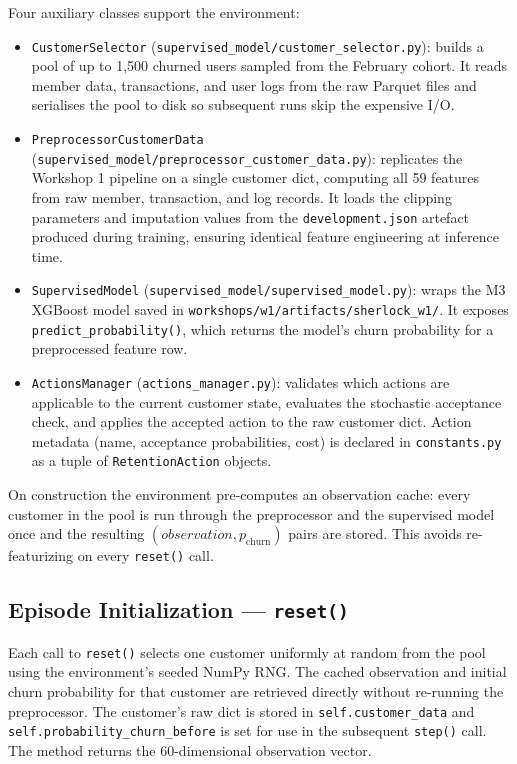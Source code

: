 \documentclass{article}
\begin{document}
Four auxiliary classes support the environment:

\begin{itemize}
\item \texttt{CustomerSelector} (\texttt{supervised\_model/customer\_selector.py}):
builds a pool of up to 1{,}500 churned users sampled from the February cohort.
It reads member data, transactions, and user logs from the raw Parquet files
and serialises the pool to disk so subsequent runs skip the expensive I/O.

\item \texttt{PreprocessorCustomerData} (\texttt{supervised\_model/preprocessor\_customer\_data.py}):
replicates the Workshop 1 pipeline on a single customer dict, computing all 59
features from raw member, transaction, and log records. It loads the clipping
parameters and imputation values from the \texttt{development.json} artefact
produced during training, ensuring identical feature engineering at inference time.

\item \texttt{SupervisedModel} (\texttt{supervised\_model/supervised\_model.py}):
wraps the M3 XGBoost model saved in \texttt{workshops/w1/artifacts/sherlock\_w1/}.
It exposes \texttt{predict\_probability()}, which returns the model's churn
probability for a preprocessed feature row.

\item \texttt{ActionsManager} (\texttt{actions\_manager.py}):
validates which actions are applicable to the current customer state,
evaluates the stochastic acceptance check, and applies the accepted action
to the raw customer dict. Action metadata (name, acceptance probabilities,
cost) is declared in \texttt{constants.py} as a tuple of \texttt{RetentionAction} objects.
\end{itemize}

On construction the environment pre-computes an observation cache: every
customer in the pool is run through the preprocessor and the supervised model
once and the resulting $(observation, p_{\text{churn}})$ pairs are stored.
This avoids re-featurizing on every \texttt{reset()} call.

\subsection{Episode Initialization --- \texttt{reset()}}

Each call to \texttt{reset()} selects one customer uniformly at random from the
pool using the environment's seeded NumPy RNG. The cached observation and initial
churn probability for that customer are retrieved directly without re-running the
preprocessor. The customer's raw dict is stored in \texttt{self.customer\_data}
and \texttt{self.probability\_churn\_before} is set for use in the subsequent
\texttt{step()} call. The method returns the 60-dimensional observation vector.
\end{document}
